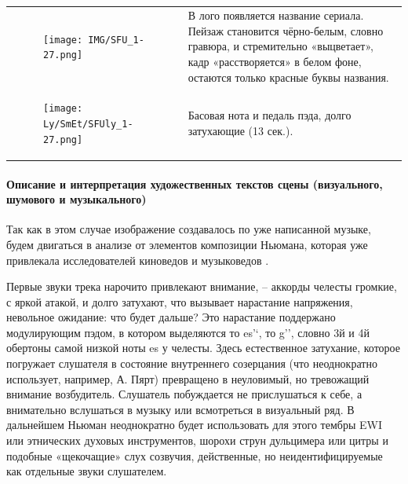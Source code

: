 \begin{longtable}[]{@{}ll@{}}
\begin{minipage}[t]{0.48\columnwidth}
\begin{figure}
\centering
\texttt{[image: IMG/SFU\_1-27.png]}
\caption{}
\end{figure}
\strut
\end{minipage} & \begin{minipage}[t]{0.48\columnwidth}\raggedright\strut
В лого появляется название сериала.
Пейзаж становится чёрно-белым, словно гравюра,
и стремительно «выцветает», кадр «расстворяется»
в белом фоне, остаются только красные буквы названия.\strut
\end{minipage}\tabularnewline
\begin{minipage}[t]{0.32\columnwidth}\raggedright\strut
\begin{figure}
\centering
\texttt{[image: Ly/SmEt/SFUly\_1-27.png]}
\caption{}
\end{figure}
\strut
\end{minipage} & \begin{minipage}[t]{0.62\columnwidth}\raggedright\strut
Басовая нота и педаль пэда, долго затухающие (13 сек.).\strut
\end{minipage}\tabularnewline
\bottomrule
\end{longtable}

\paragraph{Описание и интерпретация художественных текстов сцены (визуального, шумового и музыкального)}\label{ux43eux43fux438ux441ux430ux43dux438ux435-ux438-ux438ux43dux442ux435ux440ux43fux440ux435ux442ux430ux446ux438ux44f-ux445ux443ux434ux43eux436ux435ux441ux442ux432ux435ux43dux43dux44bux445-ux442ux435ux43aux441ux442ux43eux432-ux441ux446ux435ux43dux44b-ux432ux438ux437ux443ux430ux43bux44cux43dux43eux433ux43e-ux448ux443ux43cux43eux432ux43eux433ux43e-ux438-ux43cux443ux437ux44bux43aux430ux43bux44cux43dux43eux433ux43e-4}

Так как в этом случае изображение создавалось по уже написанной музыке, будем двигаться в анализе от элементов композиции Ньюмана, которая уже привлекала исследователей киноведов и музыковедов \autocite[ Сс. 196--198]{akass.SFU.2005}.

Первые звуки трека нарочито привлекают внимание, -- аккорды челесты громкие, с яркой атакой, и долго затухают, что вызывает нарастание напряжения, невольное ожидание: что будет дальше?
Это нарастание поддержано модулирующим пэдом, в котором выделяются то es'`, то g'', словно 3й и 4й обертоны самой низкой ноты es у челесты.
Здесь естественное затухание, которое погружает слушателя в состояние внутреннего созерцания (что неоднократно использует, например, А. Пярт) превращено в неуловимый, но тревожащий внимание возбудитель.
Слушатель побуждается не прислушаться к себе, а внимательно вслушаться в музыку или всмотреться в визуальный ряд.
В дальнейшем Ньюман неоднократно будет использовать для этого тембры EWI или этнических духовых инструментов, шорохи струн дульцимера или цитры и подобные «щекочащие» слух созвучия, действенные, но неидентифицируемые как отдельные звуки слушателем.

